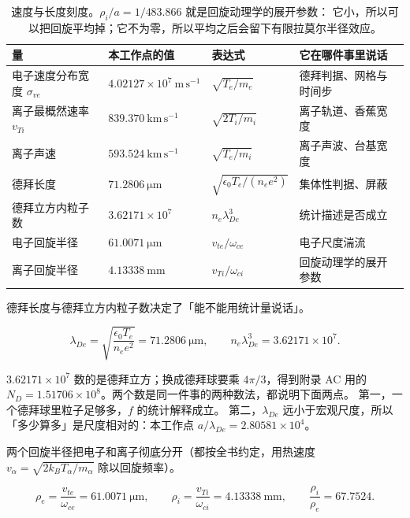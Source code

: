 \begin{table}[htbp]
\centering
\small
\caption{速度与长度刻度。$\rho_i/a=1/483.866$ 就是回旋动理学的展开参数：
它小，所以可以把回旋平均掉；它不为零，所以平均之后会留下有限拉莫尔半径效应。}
\label{tab:app-ae-scales}
\begin{tabular}{p{3.0cm}p{3.4cm}p{3.2cm}p{4.4cm}}
\toprule
量 & 本工作点的值 & 表达式 & 它在哪件事里说话 \\
\midrule
电子速度分布宽度 $\sigma_{ve}$ & $4.02127\times10^{7}\ \mathrm{m\,s^{-1}}$ & $\sqrt{T_e/m_e}$ & 德拜判据、网格与时间步 \\
离子最概然速率 $v_{Ti}$ & $839.370\ \mathrm{km\,s^{-1}}$ & $\sqrt{2T_i/m_i}$ & 离子轨道、香蕉宽度 \\
离子声速 & $593.524\ \mathrm{km\,s^{-1}}$ & $\sqrt{T_e/m_i}$ & 离子声波、台基宽度 \\
德拜长度 & $71.2806\ \mathrm{\mu m}$ & $\sqrt{\epsilon_0T_e/(n_ee^2)}$ & 集体性判据、屏蔽 \\
德拜立方内粒子数 & $3.62171\times10^{7}$ & $n_e\lambda_{De}^3$ & 统计描述是否成立 \\
电子回旋半径 & $61.0071\ \mathrm{\mu m}$ & $v_{te}/\omega_{ce}$ & 电子尺度湍流 \\
离子回旋半径 & $4.13338\ \mathrm{mm}$ & $v_{Ti}/\omega_{ci}$ & 回旋动理学的展开参数 \\
\bottomrule
\end{tabular}

\end{table}

德拜长度与德拜立方内粒子数决定了「能不能用统计量说话」。

\begin{equation}
\lambda_{De}=\sqrt{\frac{\epsilon_0T_e}{n_ee^2}}=71.2806\ \mathrm{\mu m},\qquad
n_e\lambda_{De}^3=3.62171\times10^{7} .
\label{eq:app-ae-debye}
\end{equation}

$3.62171\times10^{7}$ 数的是德拜立方；换成德拜球要乘 $4\pi/3$，得到附录 AC 用的 $N_D=1.51706\times10^{8}$。两个数是同一件事的两种数法，都说明下面两点。
第一，一个德拜球里粒子足够多，$f$ 的统计解释成立。
第二，$\lambda_{De}$ 远小于宏观尺度，所以「多少算多」是尺度相对的：本工作点 $a/\lambda_{De}=2.80581\times10^{4}$。

两个回旋半径把电子和离子彻底分开（都按全书约定，用热速度 $v_\alpha=\sqrt{2k_BT_\alpha/m_\alpha}$ 除以回旋频率）。

\begin{equation}
\rho_e=\frac{v_{te}}{\omega_{ce}}=61.0071\ \mathrm{\mu m},\qquad
\rho_i=\frac{v_{Ti}}{\omega_{ci}}=4.13338\ \mathrm{mm},\qquad
\frac{\rho_i}{\rho_e}=67.7524 .
\label{eq:app-ae-rho}
\end{equation}

